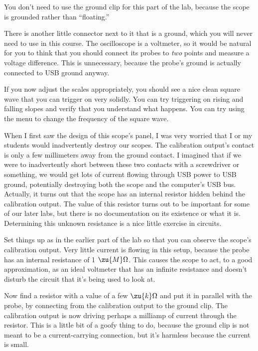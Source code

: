 You don't need to use the ground clip for this part of the lab, because the
scope is grounded rather than ``floating.''

There is another little connector next to it that
is a ground, which you will never need to use in this course.
The oscilloscope is a voltmeter, so it would be
natural for you to think that you should connect its probes to \emph{two} points and measure a voltage
difference. This is unnecessary, because the probe's ground is actually connected to USB ground anyway.

If you now adjust the scales appropriately, you should see a nice clean square wave that you can trigger
on very solidly. You can try triggering on rising and falling slopes and verify that you understand what
happens. You can try using the menu to change the frequency of the square wave.


When I first saw the design of this scope's panel, I was very worried that I or
my students would inadvertently destroy our scopes. The calibration output's contact is only
a few millimeters away from the ground contact. I imagined that if we were to inadvertently
short between these two contacts with a screwdriver or something, we would get lots of
current flowing through USB power to USB ground, potentially destroying both the
scope and the computer's USB bus. Actually, it turns out that the scope has an internal
resistor hidden behind the calibration output. The value of this resistor turns out to
be important for some of our later labs, but there is no documentation on its existence
or what it is. Determining this unknown resistance is a nice little exercise in circuits.

Set things up as in the earlier part of the lab so that you can observe the
scope's calibration output. Very little current is flowing in this setup, because
the probe has an internal resistance of 1 $\zu{M}\Omega$. This causes the scope to act,
to a good approximation, as an ideal voltmeter that has an infinite resistance and
doesn't disturb the circuit that it's being used to look at.

Now find a resistor with a value of a few $\zu{k}\Omega$ and put it in parallel with
the probe, by connecting from the calibration output to the ground clip. The calibration
output is now driving perhaps a milliamp of current through the resistor. This is a little
bit of a goofy thing to do, because the ground clip is not meant to be a current-carrying
connection, but it's harmless because the current is small.

